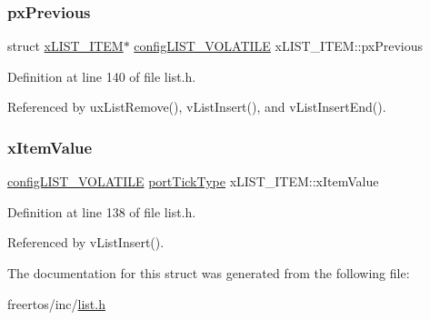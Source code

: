 \mbox{\label{structxLIST__ITEM_ae8e553eae41010a8e41c66d76c94110b}} 
\subsubsection{\texorpdfstring{px\+Previous}{pxPrevious}}
{\footnotesize\ttfamily struct \hyperlink{structxLIST__ITEM}{x\+L\+I\+S\+T\+\_\+\+I\+T\+EM}$\ast$ \hyperlink{list_8h_a2d5de557c5561c8980d1bf51d87d8cba}{config\+L\+I\+S\+T\+\_\+\+V\+O\+L\+A\+T\+I\+LE} x\+L\+I\+S\+T\+\_\+\+I\+T\+E\+M\+::px\+Previous}



Definition at line 140 of file list.\+h.



Referenced by ux\+List\+Remove(), v\+List\+Insert(), and v\+List\+Insert\+End().

\mbox{\label{structxLIST__ITEM_acdfef3a9fbae98cef8adc272850ef31c}} 
\subsubsection{\texorpdfstring{x\+Item\+Value}{xItemValue}}
{\footnotesize\ttfamily \hyperlink{list_8h_a2d5de557c5561c8980d1bf51d87d8cba}{config\+L\+I\+S\+T\+\_\+\+V\+O\+L\+A\+T\+I\+LE} \hyperlink{portmacro_8h_a4d746b2ff8fafc490b764c66411ec457}{port\+Tick\+Type} x\+L\+I\+S\+T\+\_\+\+I\+T\+E\+M\+::x\+Item\+Value}



Definition at line 138 of file list.\+h.



Referenced by v\+List\+Insert().



The documentation for this struct was generated from the following file\+:\begin{DoxyCompactItemize}
\item 
freertos/inc/\hyperlink{list_8h}{list.\+h}\end{DoxyCompactItemize}
